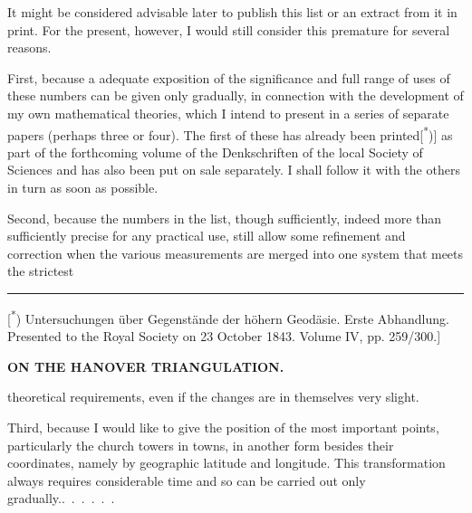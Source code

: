 \par\noindent\hspace*{\parindent}It might be considered advisable later to publish this list or an extract from it in print. For the present, however, I would still consider this premature for several reasons.

\par\noindent\hspace*{\parindent}First, because a  adequate exposition of the significance and full range of uses of these numbers can be given only gradually, in connection with the development of my own mathematical theories, which I intend to present in a series of separate papers (perhaps three or four). The first of these has already been printed[\textsuperscript{*})] as part of the forthcoming volume of the Denkschriften of the local Society of Sciences and has also been put on sale separately. I shall follow it with the others in turn as soon as possible.

\par\noindent\hspace*{\parindent}Second, because the numbers in the list, though sufficiently, indeed more than sufficiently precise for any practical use, still allow some refinement and correction when the various measurements are merged into one system that meets the strictest

\par\smallskip\noindent\rule{.24\linewidth}{.4pt}\par\smallskip
{\footnotesize\noindent\hspace*{\parindent}[\textsuperscript{*}) Untersuchungen über Gegenstände der höhern Geodäsie. Erste Abhandlung. Presented to the Royal Society on 23 October 1843. Volume IV, pp. 259/300.]\par}

\par\clearpage
\noindent\null\hfill{\small\textbf{ON THE HANOVER TRIANGULATION.}}\hfill{}\par\medskip

\noindent theoretical requirements, even if the changes are in themselves very slight.

\par\noindent\hspace*{\parindent}Third, because I would like to give the position of the most important points, particularly the church towers in towns, in another form besides their coordinates, namely by geographic latitude and longitude. This transformation always requires considerable time and so can be carried out only \mbox{gradually.\quad\mbox{.\ .\ .\ .\ .\ .}}

